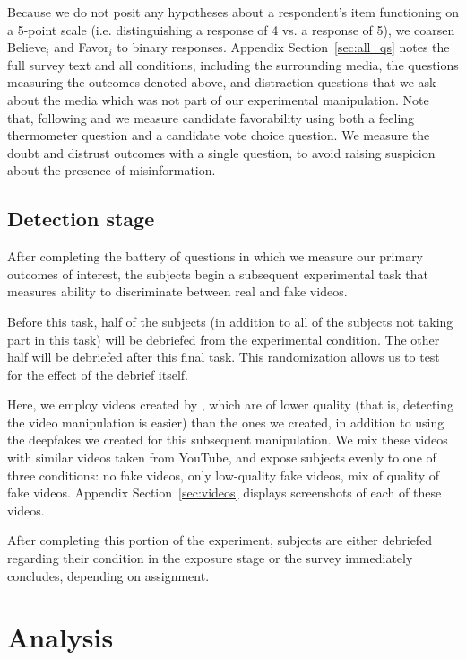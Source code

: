 \documentclass[12pt,letterpaper]{article}
\begin{document}
\noindent Because we do not posit any hypotheses about a respondent's item functioning on a 5-point scale (i.e. distinguishing a response of 4 vs. a response of 5), we coarsen \textsf{Believe}$_i$ and \textsf{Favor}$_i$ to binary responses. Appendix Section~\ref{sec:all_qs} notes the full survey text and all conditions, including the surrounding media, the questions measuring the outcomes denoted above, and distraction questions that we ask about the media which was not part of our experimental manipulation. Note that, following \cite{huber2007identifying} and \citep{brader2006campaigning} we measure candidate favorability using both a feeling thermometer question and a candidate vote choice question. We measure the doubt and distrust outcomes with a single question, to avoid raising suspicion about the presence of misinformation.

\subsection{Detection stage}

After completing the battery of questions in which we measure our primary outcomes of interest, the subjects begin a subsequent experimental task that measures ability to discriminate between real and fake videos. 

Before this task, half of the subjects (in addition to all of the subjects not taking part in this task) will be debriefed from the experimental condition. The other half will be debriefed after this final task. This randomization allows us to test for the effect of the debrief itself. 

Here, we employ videos created by \cite{agarwal2019protecting}, which are of lower quality (that is, detecting the video manipulation is easier) than the ones we created, in addition to using the deepfakes we created for this subsequent manipulation. We mix these videos with similar videos taken from YouTube, and expose subjects evenly to one of three conditions: no fake videos, only low-quality fake videos, mix of quality of fake videos. Appendix Section~\ref{sec:videos} displays screenshots of each of these videos.

After completing this portion of the experiment, subjects are either debriefed regarding their condition in the exposure stage or the survey immediately concludes, depending on assignment. %

\section{Analysis}
\end{document}
